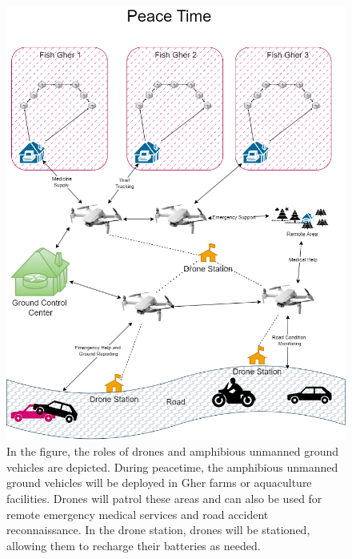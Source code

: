\documentclass[conference]{IEEEtran}
\begin{document}
\begin{figure}[h]
    \centering
    \includegraphics[width=\linewidth]{peace_time.jpg}
    \caption{In the figure, the roles of drones and amphibious unmanned ground vehicles are depicted. During peacetime, the amphibious unmanned ground vehicles will be deployed in Gher farms or aquaculture facilities. Drones will patrol these areas and can also be used for remote emergency medical services and road accident reconnaissance. In the drone station, drones will be stationed, allowing them to recharge their batteries as needed.}
    \label{fig:gher_freshwater}
\end{figure}
\end{document}
